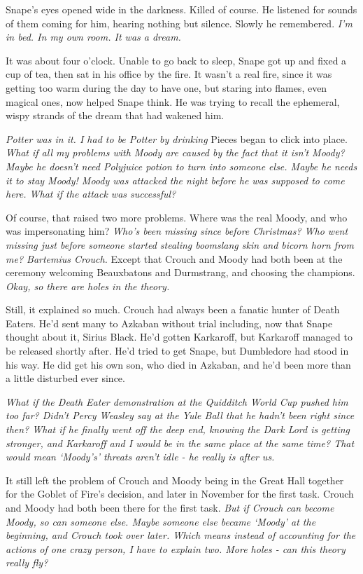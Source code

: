 \sbreak

Snape's eyes opened wide in the darkness. Killed{\el} of course. He listened for sounds of them coming for him, hearing nothing but silence. Slowly he remembered. \emph{I'm in bed. In my own room. It was a dream.}

It was about four o'clock. Unable to go back to sleep, Snape got up and fixed a cup of tea, then sat in his office by the fire. It wasn't a real fire, since it was getting too warm during the day to have one, but staring into flames, even magical ones, now helped Snape think. He was trying to recall the ephemeral, wispy strands of the dream that had wakened him.

\emph{Potter was in it. I had to be Potter by drinking{\el}} Pieces began to click into place. \emph{What if all my problems with Moody are caused by the fact that it isn't Moody? Maybe he doesn't need Polyjuice potion to turn into someone else. Maybe he needs it to stay Moody! Moody was attacked the night before he was supposed to come here. What if the attack was successful?}

Of course, that raised two more problems. Where was the real Moody, and who was impersonating him? \emph{Who's been missing since before Christmas? Who went missing just before someone started stealing boomslang skin and bicorn horn from me? Bartemius Crouch.} Except that Crouch and Moody had both been at the ceremony welcoming Beauxbatons and Durmstrang, and choosing the champions. \emph{Okay, so there are holes in the theory.}

Still, it explained so much. Crouch had always been a fanatic hunter of Death Eaters. He'd sent many to Azkaban without trial including, now that Snape thought about it, Sirius Black. He'd gotten Karkaroff, but Karkaroff managed to be released shortly after. He'd tried to get Snape, but Dumbledore had stood in his way. He did get his own son, who died in Azkaban, and he'd been more than a little disturbed ever since.

\emph{What if the Death Eater demonstration at the Quidditch World Cup pushed him too far? Didn't Percy Weasley say at the Yule Ball that he hadn't been right since then? What if he finally went off the deep end, knowing the Dark Lord is getting stronger, and Karkaroff and I would be in the same place at the same time? That would mean `Moody's' threats aren't idle - he really is after us.}

It still left the problem of Crouch and Moody being in the Great Hall together for the Goblet of Fire's decision, and later in November for the first task. Crouch and Moody had both been there for the first task. \emph{But if Crouch can become Moody, so can someone else. Maybe someone else became `Moody' at the beginning, and Crouch took over later. Which means instead of accounting for the actions of one crazy person, I have to explain two. More holes - can this theory really fly?}

